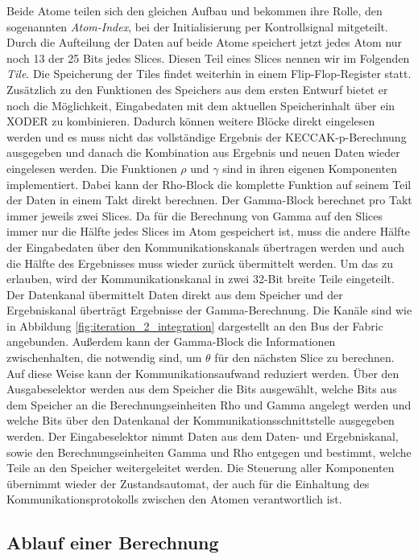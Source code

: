Beide Atome teilen sich den gleichen Aufbau und bekommen ihre Rolle, den sogenannten \textit{Atom-Index}, bei der Initialisierung per Kontrollsignal mitgeteilt.
Durch die Aufteilung der Daten auf beide Atome speichert jetzt jedes Atom nur noch 13 der 25 Bits jedes Slices. Diesen Teil eines Slices nennen wir im Folgenden \textit{Tile}.
Die Speicherung der Tiles findet weiterhin in einem Flip-Flop-Register statt. Zusätzlich zu den Funktionen des Speichers aus dem ersten Entwurf bietet er noch die Möglichkeit,
Eingabedaten mit dem aktuellen Speicherinhalt über ein XODER zu kombinieren. Dadurch können weitere Blöcke direkt eingelesen werden und es muss nicht das vollständige Ergebnis
der KECCAK-p-Berechnung ausgegeben und danach die Kombination aus Ergebnis und neuen Daten wieder eingelesen werden.
Die Funktionen $\rho$ und $\gamma$ sind in ihren eigenen Komponenten implementiert.
Dabei kann der Rho-Block die komplette Funktion auf seinem Teil der Daten in einem Takt direkt berechnen. Der Gamma-Block berechnet pro Takt immer jeweils zwei Slices.
Da für die Berechnung von Gamma auf den Slices immer nur die Hälfte jedes Slices im Atom gespeichert ist, muss die andere Hälfte der Eingabedaten über den Kommunikationskanals
übertragen werden und auch die Hälfte des Ergebnisses muss wieder zurück übermittelt werden. Um das zu erlauben, wird der Kommunikationskanal in zwei 32-Bit breite Teile eingeteilt.
Der Datenkanal übermittelt Daten direkt aus dem Speicher und der Ergebniskanal überträgt Ergebnisse der Gamma-Berechnung. Die Kanäle sind wie in Abbildung
\ref{fig:iteration_2_integration} dargestellt an den Bus der Fabric angebunden. Außerdem kann der Gamma-Block die Informationen zwischenhalten, die notwendig sind,
um $\theta$ für den nächsten Slice zu berechnen. Auf diese Weise kann der Kommunikationsaufwand reduziert werden.
Über den Ausgabeselektor werden aus dem Speicher die Bits ausgewählt, welche Bits aus dem Speicher an die Berechnungseinheiten Rho und Gamma angelegt werden
und welche Bits über den Datenkanal der Kommunikationsschnittstelle ausgegeben werden. Der Eingabeselektor nimmt Daten aus dem Daten- und Ergebniskanal,
sowie den Berechnungseinheiten Gamma und Rho entgegen und bestimmt, welche Teile an den Speicher weitergeleitet werden.
Die Steuerung aller Komponenten übernimmt wieder der Zustandsautomat, der auch für die Einhaltung des Kommunikationsprotokolls zwischen den Atomen verantwortlich ist.

\subsection{Ablauf einer Berechnung}
